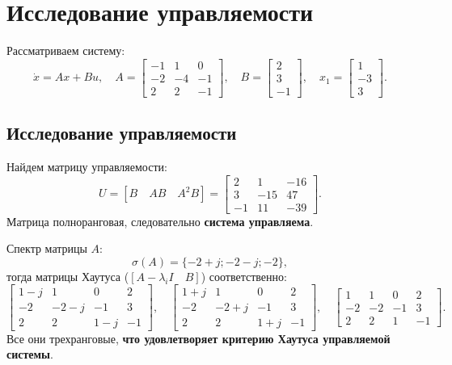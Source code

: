 \section{Исследование управляемости}

Рассматриваем систему:
\begin{equation*}
    \dot x=Ax+Bu,\quad
    A=\begin{bmatrix}
        -1 & 1 & 0 \\ -2 & -4 & -1 \\ 2 & 2 & -1
    \end{bmatrix},\quad
    B=\begin{bmatrix}
        2 \\ 3 \\ -1
    \end{bmatrix},\quad
    x_1=\begin{bmatrix}
        1 \\ -3 \\ 3
    \end{bmatrix}.
\end{equation*}

\subsection{Исследование управляемости}

Найдем матрицу управляемости:
\begin{equation*}
    U=[B\quad AB\quad A^2B]=
    \begin{bmatrix}
        2 & 1 & -16 \\ 3 & -15 & 47 \\ -1 & 11 & -39
    \end{bmatrix}.
\end{equation*}
Матрица полноранговая, следовательно \textbf{система управляема}.

Спектр матрицы $A$:
$$\sigma(A)=\{ -2 + j; -2-j; -2\},$$
тогда матрицы Хаутуса ($[A-\lambda_iI\quad B]$) соответственно:
\begin{equation*}
    \begin{bmatrix}
        1-j&1&0&2\\-2&-2-j&-1&3\\2&2&1-j&-1
    \end{bmatrix},\quad 
    \begin{bmatrix}
        1+j&1&0&2\\-2&-2+j&-1&3\\2&2&1+j&-1
    \end{bmatrix},\quad
    \begin{bmatrix}
        1 & 1 & 0 & 2 \\
        -2 & -2 & -1 & 3 \\
        2 & 2 & 1 & -1
    \end{bmatrix}.
\end{equation*}
Все они трехранговые, \textbf{что удовлетворяет критерию Хаутуса управляемой системы}.

